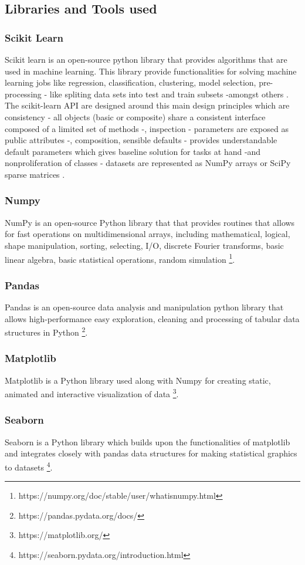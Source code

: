 \documentclass[conference]{IEEEtran}
\begin{document}
\subsection{Libraries and Tools used}
\subsubsection{Scikit Learn}
Scikit learn is an open-source python library that provides algorithms that are used in machine learning. This library provide functionalities for solving machine learning jobs like 
regression, classification, clustering, model selection, pre-processing - like spliting data sets into test and train subsets -amongst others \cite{scikit_learn}. The scikit-learn API are designed around this main design principles which are consistency - all objects (basic or composite) share a consistent interface composed of a limited set of methods -, inspection - parameters are exposed as public attributes -, composition, sensible defaults - provides understandable default parameters which gives baseline solution for tasks at hand -and nonproliferation of classes - datasets are represented as NumPy arrays or SciPy sparse matrices \cite{sklearn_api}.
\subsubsection{Numpy}
NumPy is an open-source Python library that that provides routines that allows for fast operations on multidimensional arrays, including mathematical, logical, shape manipulation, sorting, selecting, I/O, discrete Fourier transforms, basic linear algebra, basic statistical operations, random simulation \footnote{https://numpy.org/doc/stable/user/whatisnumpy.html}.
\subsubsection{Pandas}
Pandas is an open-source data analysis and manipulation python library that allows high-performance easy exploration, cleaning and processing of tabular data structures in Python \footnote{https://pandas.pydata.org/docs/}.
\subsubsection{Matplotlib}
Matplotlib is a Python library used along with Numpy for creating static, animated and interactive visualization of data \footnote{https://matplotlib.org/}.
\subsubsection{Seaborn}
Seaborn is a Python library which builds upon the functionalities of matplotlib and integrates closely with pandas data structures for making statistical graphics to datasets \footnote{https://seaborn.pydata.org/introduction.html}.
\end{document}
